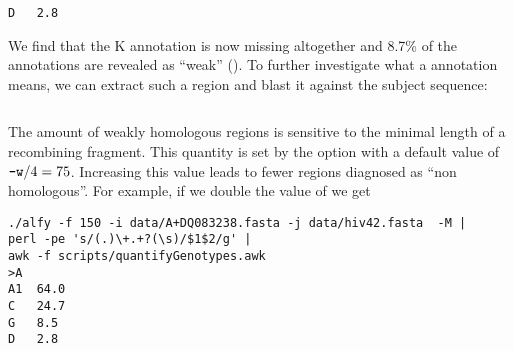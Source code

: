 \documentclass{article}
\begin{document}
\begin{itemize}
\begin{verbatim}
D	2.8
\end{verbatim}
We find that the K annotation  is now missing altogether and 8.7\% of
the annotations are revealed as ``weak'' ().
\I To further investigate what a  annotation means, we can
extract such a region and blast it against the subject sequence:
\begin{verbatim}
\end{verbatim}
\I The amount of weakly homologous regions is sensitive to the minimal
length of a recombining fragment. This quantity is set by the 
option with a default value of $\texttt{-w}/4=75$. Increasing this value
leads to fewer regions diagnosed as ``non homologous''. For example,
if we double the value of  we get
\begin{verbatim}
./alfy -f 150 -i data/A+DQ083238.fasta -j data/hiv42.fasta  -M |
perl -pe 's/(.)\+.+?(\s)/$1$2/g' | 
awk -f scripts/quantifyGenotypes.awk
>A
A1	64.0
C	24.7
G	8.5
D	2.8
\end{verbatim}



\end{itemize}
\end{document}
